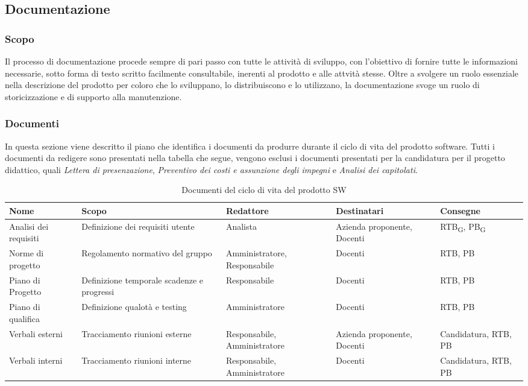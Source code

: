 \subsection{Documentazione}
\subsubsection{Scopo}
Il processo di documentazione procede sempre di pari passo con tutte le attività di sviluppo, con l'obiettivo di fornire tutte le informazioni necessarie, sotto forma di testo scritto facilmente consultabile, inerenti al prodotto e alle attvità stesse. Oltre a svolgere un ruolo essenziale nella descrizione del prodotto per coloro che lo sviluppano, lo distribuiscono e lo utilizzano, la documentazione svoge un ruolo di storicizzazione e di supporto alla manutenzione. 

\subsubsection{Documenti}
In questa sezione viene descritto il piano che identifica i documenti da produrre durante il ciclo di vita del prodotto software. Tutti i documenti da redigere sono presentati nella tabella che segue, vengono esclusi i documenti presentati per la candidatura per il progetto didattico, quali \textit{Lettera di presenzazione}, \textit{Preventivo dei costi e assunzione degli impegni} e \textit{Analisi dei capitolati}.


\begin{table}[H]
    \centering
   \begin{tabularx}{\textwidth}{X|X|X|X|X}
        \textbf{Nome} & \textbf{Scopo} & \textbf{Redattore} & \textbf{Destinatari} & \textbf{Consegne} \\ \hline
        Analisi dei requisiti    & Definizione dei requisiti utente    & Analista & Azienda proponente, Docenti & RTB\textsubscript{G}, PB\textsubscript{G}    \\ \hline
        Norme di progetto    & Regolamento normativo del gruppo    & Amministratore, Responsabile &  Docenti & RTB, PB    \\ \hline
        Piano di Progetto   & Definizione temporale scadenze e progressi    & Responsabile &  Docenti & RTB, PB   \\ \hline
        Piano di qualifica   & Definizione qualotà e testing    & Amministratore &  Docenti & RTB, PB   \\ \hline
         Verbali esterni   & Tracciamento riunioni esterne   & Responsabile, Amministratore &  Azienda proponente, Docenti & Candidatura, RTB, PB   \\ \hline
         Verbali interni   & Tracciamento riunioni interne   & Responsabile, Amministratore &  Docenti & Candidatura, RTB, PB  
       
    \end{tabularx}
    \caption{Documenti del ciclo di vita del prodotto SW}
\end{table}


